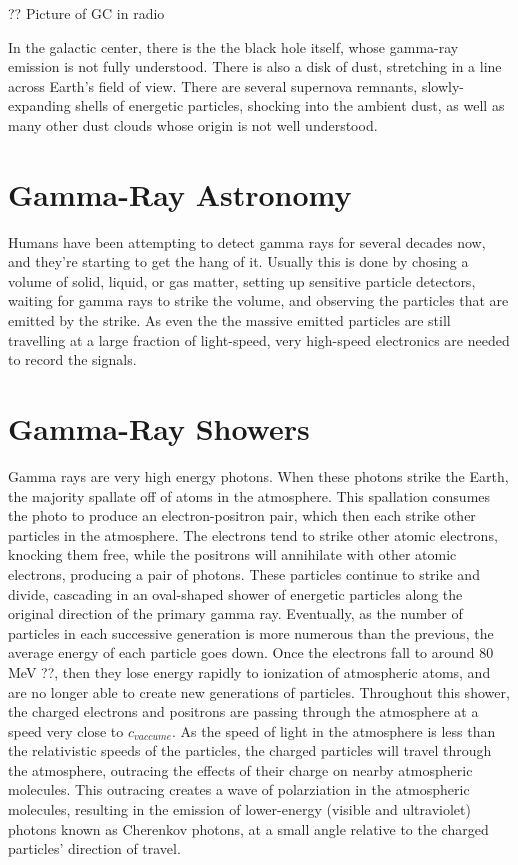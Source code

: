 ?? Picture of GC in radio

In the galactic center, there is the the black hole itself, whose gamma-ray emission is not fully understood.
There is also a disk of dust, stretching in a line across Earth's field of view.
There are several supernova remnants, slowly-expanding shells of energetic particles, shocking into the ambient dust, as well as many other dust clouds whose origin is not well understood.


\section{Gamma-Ray Astronomy}
Humans have been attempting to detect gamma rays for several decades now, and they're starting to get the hang of it.
Usually this is done by chosing a volume of solid, liquid, or gas matter, setting up sensitive particle detectors, waiting for gamma rays to strike the volume, and observing the particles that are emitted by the strike.
As even the the massive emitted particles are still travelling at a large fraction of light-speed, very high-speed electronics are needed to record the signals.


\section{Gamma-Ray Showers}
Gamma rays are very high energy photons.
When these photons strike the Earth, the majority spallate off of atoms in the atmosphere.
This spallation consumes the photo to produce an electron-positron pair, which then each strike other particles in the atmosphere.
The electrons tend to strike other atomic electrons, knocking them free, while the positrons will annihilate with other atomic electrons, producing a pair of photons.
These particles continue to strike and divide, cascading in an oval-shaped shower of energetic particles along the original direction of the primary gamma ray.
Eventually, as the number of particles in each successive generation is more numerous than the previous, the average energy of each particle goes down.
Once the electrons fall to around 80 MeV ??, then they lose energy rapidly to ionization of atmospheric atoms, and are no longer able to create new generations of particles.
Throughout this shower, the charged electrons and positrons are passing through the atmosphere at a speed very close to $c_{vaccume}$.
As the speed of light in the atmosphere is less than the relativistic speeds of the particles, the charged particles will travel through the atmosphere, outracing the effects of their charge on nearby atmospheric molecules.
This outracing creates a wave of polarziation in the atmospheric molecules, resulting in the emission of lower-energy (visible and ultraviolet) photons known as Cherenkov photons, at a small angle relative to the charged particles' direction of travel.

